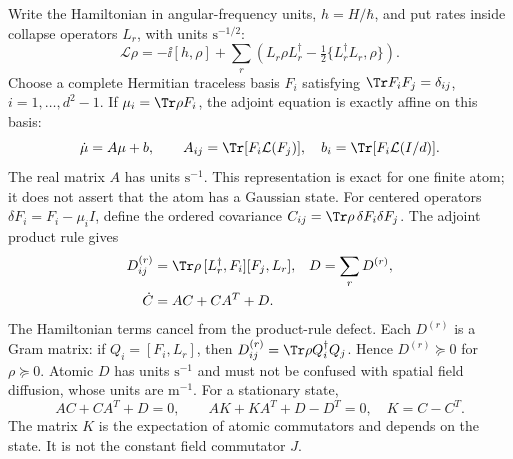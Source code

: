 Write the Hamiltonian in angular-frequency units, $h=H/\hbar$, and put rates
inside collapse operators $L_r$, with units $\mathrm{s}^{-1/2}$:
\begin{equation}
 \mathcal L\rho=-\ii[h,\rho]+\sum_r
 \left(L_r\rho L_r^\dagger-\tfrac12\{L_r^\dagger L_r,\rho\}\right).
 \label{eq:gc-gksl}
\end{equation}
Choose a complete Hermitian traceless basis $F_i$ satisfying
$\Tr F_iF_j=\delta_{ij}$, $i=1,\ldots,d^2-1$. If $\mu_i=\Tr\rho F_i$,
the adjoint equation is exactly affine on this basis:
\begin{equation}
 \dot\mu=A\mu+b,\qquad
 A_{ij}=\Tr[F_i\mathcal L(F_j)],\quad
 b_i=\Tr[F_i\mathcal L(I/d)].
 \label{eq:gc-atomic-drift}
\end{equation}
The real matrix $A$ has units $\mathrm{s}^{-1}$. This representation is exact
for one finite atom; it does not assert that the atom has a Gaussian state.
For centered operators $\delta F_i=F_i-\mu_i I$, define the ordered covariance
$C_{ij}=\Tr\rho\,\delta F_i\delta F_j$. The adjoint product rule gives
\begin{align}
 D^{(r)}_{ij}&=\Tr\rho\,[L_r^\dagger,F_i][F_j,L_r],
 &D&=\sum_rD^{(r)},\label{eq:gc-einstein}\\
 \dot C&=AC+CA^T+D. &&\label{eq:gc-covariance-identity}
\end{align}
The Hamiltonian terms cancel from the product-rule defect. Each $D^{(r)}$
is a Gram matrix: if $Q_i=[F_i,L_r]$, then
$D^{(r)}_{ij}=\Tr\rho Q_i^\dagger Q_j$. Hence $D^{(r)}\succeq0$ for
$\rho\succeq0$. Atomic $D$ has units $\mathrm{s}^{-1}$ and must not be
confused with spatial field diffusion, whose units are $\mathrm{m}^{-1}$.
For a stationary state,
\begin{equation}
 AC+CA^T+D=0,\qquad
 AK+KA^T+D-D^T=0,\quad K=C-C^T.
 \label{eq:gc-stationary-identities}
\end{equation}
The matrix $K$ is the expectation of atomic commutators and depends on the
state. It is not the constant field commutator $J$.

